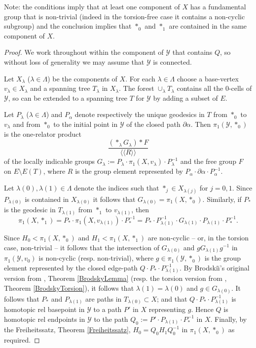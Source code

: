 \documentclass[12pt,a4paper]{amsart}
\def\<{\langle}
\def\>{\rangle}
\def\a{\alpha}
\begin{document}
Note: the conditions imply that at least one component  of $X$ has a fundamental group 
that is non-trivial
(indeed  in the torsion-free case it contains a non-cyclic subgroup) and the conclusion implies that $*_0$ and $*_1$ are contained in the same
component of $X$.

\begin{proof}
	We  work throughout within the component of $\mathcal{Y}$ that contains $Q$, so without loss of generality we may assume that $\mathcal{Y}$ is connected. 
	
	Let  $X_{\lambda}$ ($\lambda\in\Lambda$) be the components of $X$. 
	For each $\lambda\in\Lambda$ choose a base-vertex $v_\lambda\in X_{\lambda}$ and a spanning tree $T_\lambda$ in
	 $X_{\lambda}$.   
	 The forest $\cup_\lambda T_\lambda$ contains all the $0$-cells of $\mathcal{Y}$, so can be extended to a spanning tree $T$ for $\mathcal{Y}$ by adding a subset of  $E$.
	
	Let $P_\lambda$ ($\lambda\in\Lambda$) and $P_\a$ denote respectively the unique geodesics in $T$ from $*_0$ to $v_\lambda$ and from $*_0$ to the initial point in $\mathcal Y$ of the closed path $\partial\a$. Then $\pi_1(\mathcal{Y},*_0)$ is the one-relator product 
	$$\frac{\left(\ast_\lambda G_\lambda\right)*F}{\<\<R\>\>}$$
	of the locally indicable groups $G_\lambda:=P_\lambda\cdot\pi_1(X,v_\lambda)\cdot P_\lambda^{-1}$ and the free group $F$ on $E\setminus E(T)$, where $R$ is the group element represented by $P_\a\cdot\partial\a\cdot P_\a^{-1}$.
	
	Let $\lambda(0),\lambda(1)\in\Lambda$ denote the indices such that $*_j\in X_{\lambda(j)}$ for $j=0,1$.
	Since $P_{\lambda(0)}$ is contained in $X_{\lambda(0)}$ it follows that $G_{\lambda(0)}=\pi_1(X,*_0)$.
	Similarly, if $P_*$ is the geodesic in $T_{\lambda(1)}$ from $*_1$ to $v_{\lambda(1)}$, then 
	$$\pi_1(X,*_1)=P_*\cdot\pi_1(X,v_{\lambda(1)})\cdot P_*^{-1}=P_*\cdot P_{\lambda(1)}^{-1}\cdot G_{\lambda(1)}\cdot P_{\lambda(1)}\cdot P_*^{-1}.$$
	
	Since $H_0<\pi_1(X,*_0)$ and $H_1<\pi_1(X,*_1)$ are non-cyclic   -- or, in the torsion case, non-trivial --
	it follows that the intersection of $G_{\lambda(0)}$ and $gG_{\lambda(1)}g^{-1}$ 
	in   $\pi_1(\mathcal{Y},v_0)$ is non-cyclic  (resp. non-trivial), 
	where $g\in\pi_1(\mathcal{Y},*_0)$ is the group element represented by the closed edge-path $Q\cdot P_*\cdot P_{\lambda(1)}^{-1}$.
	By Brodski\u\i's original version from \cite{B81}, Theorem \ref{BrodskyLemma} 
	(resp. the torsion version from \cite{HS}, Theorem \ref{BrodskyTorsion}),
	it follows that $\lambda(1)=\lambda(0)$ and $g\in G_{\lambda(0)}$.  
	It follows that $P_*$ and $P_{\lambda(1)}$ are paths in $T_{\lambda(0)}\subset X$; 
	and that $Q\cdot P_*\cdot P_{\lambda(1)}^{-1}$ is 
	homotopic rel basepoint in $\mathcal{Y}$ to a path $P'$ in $X$ representing $g$.  Hence $Q$ is homotopic rel endpoints in $\mathcal{Y}$ to the path $Q_0:=P'\cdot P_{\lambda(1)}\cdot P_*^{-1}$ in $X$.   
	Finally, by the Freiheitssatz,  Theorem \ref{Freiheitssatz}, 
	$H_0=Q_0 H_1Q_0^{-1}$ in $\pi_1(X,*_0)$ as required.
\end{proof}
\end{document}
